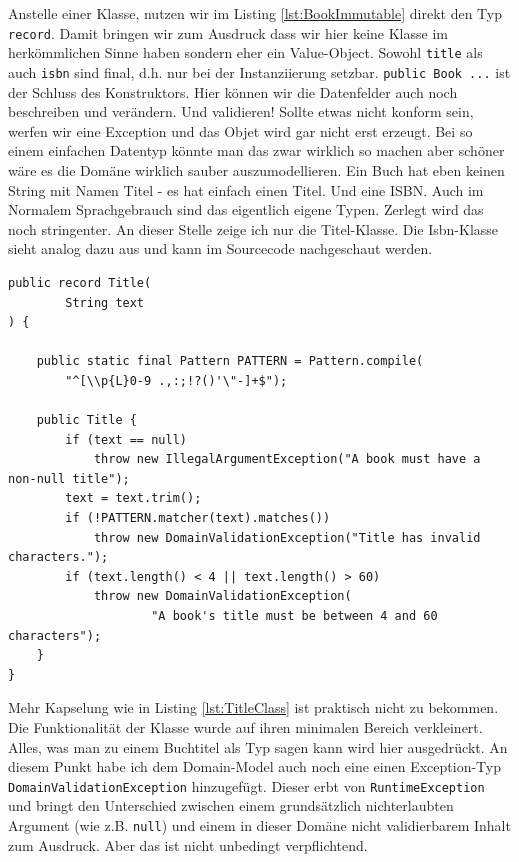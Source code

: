 Anstelle einer Klasse, nutzen wir im Listing \ref{lst:BookImmutable} 
direkt den Typ \texttt{record}. Damit
bringen wir zum Ausdruck dass wir hier keine Klasse im herkömmlichen
Sinne haben sondern eher ein Value-Object. Sowohl \texttt{title} als auch
\texttt{isbn} sind final, d.h. nur bei der Instanziierung setzbar.
\texttt{public Book {...}} ist der Schluss des Konstruktors. Hier können
wir die Datenfelder auch noch beschreiben und verändern. Und validieren!
Sollte etwas nicht konform sein, werfen wir eine Exception und das Objet
wird gar nicht erst erzeugt. Bei so einem einfachen Datentyp könnte 
man das zwar wirklich so machen aber schöner wäre es die Domäne wirklich
sauber auszumodellieren. Ein Buch hat eben keinen String mit Namen Titel - 
es hat einfach einen Titel. Und eine ISBN. Auch im Normalem Sprachgebrauch
sind das eigentlich eigene Typen. Zerlegt wird das noch stringenter. An 
dieser Stelle zeige ich nur die Titel-Klasse. Die Isbn-Klasse sieht analog
dazu aus und kann im Sourcecode nachgeschaut werden.

\begin{listing}[H]
\begin{verbatim}
public record Title(
        String text
) {
    
    public static final Pattern PATTERN = Pattern.compile(
        "^[\\p{L}0-9 .,:;!?()'\"-]+$");

    public Title {
        if (text == null)
            throw new IllegalArgumentException("A book must have a non-null title");
        text = text.trim();
        if (!PATTERN.matcher(text).matches())
            throw new DomainValidationException("Title has invalid characters.");
        if (text.length() < 4 || text.length() > 60)
            throw new DomainValidationException(
                    "A book's title must be between 4 and 60 characters");
    }
}
\end{verbatim}
\caption{Ttiel.java}
\label{lst:TitleClass}
\end{listing}

Mehr Kapselung wie in Listing \ref{lst:TitleClass} ist praktisch nicht zu 
bekommen. Die Funktionalität der Klasse wurde auf ihren minimalen Bereich 
verkleinert. Alles, was man zu einem Buchtitel als Typ sagen kann wird hier 
ausgedrückt. An diesem  Punkt habe ich dem Domain-Model auch noch eine 
einen Exception-Typ \texttt{DomainValidationException} hinzugefügt.
Dieser erbt von  \texttt{RuntimeException} und bringt den Unterschied 
zwischen einem grundsätzlich nichterlaubten Argument 
(wie z.B. \texttt{null}) und einem in dieser Domäne nicht validierbarem
Inhalt zum Ausdruck. Aber das ist nicht unbedingt verpflichtend.

